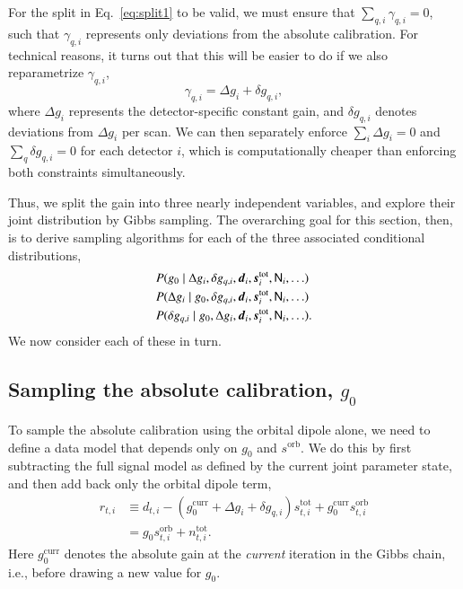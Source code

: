 \documentclass[twocolumn]{aa}
\renewcommand{\d}[0]{\vec{d}}
\newcommand{\s}[0]{\vec{s}}
\newcommand{\N}[0]{\tens{N}}
\newcommand{\ti}[0]{_{t, i}}
\newcommand{\qi}[0]{_{q, i}}
\newcommand{\tot}[0]{^{\mathrm{tot}}}
\newcommand{\orb}[0]{^{\mathrm{orb}}}
\begin{document}
For the split in Eq.~\eqref{eq:split1} to be valid, we must ensure that
$\sum\qi \gamma\qi = 0$, such that $\gamma\qi$ represents only
deviations from the absolute calibration. For technical reasons, it
turns out that this will be easier to do if we also reparametrize
$\gamma\qi$,
\begin{equation}
    \gamma\qi = \Delta g_i + \delta g\qi,
\end{equation}
where $\Delta g_i$ represents the detector-specific constant gain, and
$\delta g\qi$ denotes deviations from $\Delta g_i$ per scan. We can
then separately enforce $\sum_i \Delta g_i = 0$ and $\sum_q \delta g\qi
= 0$ for each detector $i$, which is computationally cheaper than
enforcing both constraints simultaneously.

Thus, we split the gain into three nearly independent variables, and
explore their joint distribution by Gibbs sampling. The overarching
goal for this section, then, is to derive sampling algorithms for each
of the three associated conditional distributions,
\begin{align}
    & P(g_0\mid\Delta g_i, \delta g\qi, \d_i, \s_i\tot, \N_i, \ldots) \\
    & P(\Delta g_i\mid g_0, \delta g\qi, \d_i, \s_i\tot, \N_i, \ldots) \\
    & P(\delta g\qi\mid g_0, \Delta g_i, \d_i, \s_i\tot, \N_i, \ldots).
\end{align}
We now consider each of these in turn.

\subsection{Sampling the absolute calibration, $g_0$}

To sample the absolute calibration using the orbital dipole alone, we
need to define a data model that depends only on $g_0$ and $s\orb$. We
do this by first subtracting the full signal model as defined by the
current joint parameter state, and then add back only the orbital dipole term,
\begin{align}
    r\ti & \equiv d\ti -(g_0^{\mathrm{curr}} + \Delta g_i + \delta g\qi)s\tot\ti \nonumber + g_0^{\mathrm{curr}}s\orb\ti \nonumber \\
    & = g_0s\orb\ti + n\ti\tot.
    \label{eq:absolute_gain_res}
\end{align}
Here $g_0^{\mathrm{curr}}$ denotes the absolute gain at the \emph{current}
iteration in the Gibbs chain, i.e., before drawing a new value for
$g_0$. 
\end{document}

